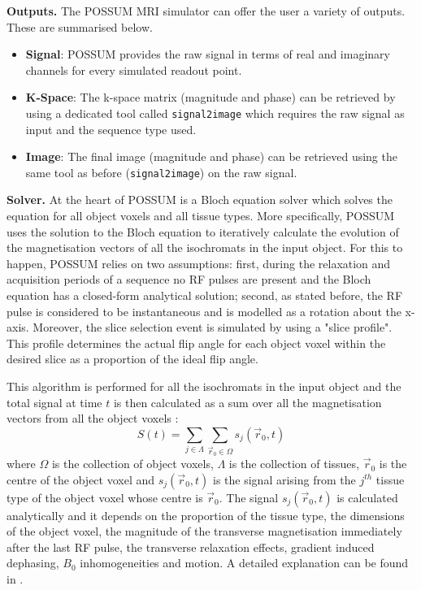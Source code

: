 \hfill

\textbf{Outputs.} The POSSUM MRI simulator can offer the user a variety of outputs.
These are summarised below.
\begin{itemize}
    
    \item \textbf{Signal}: POSSUM provides the raw signal in terms of real and imaginary channels for every simulated readout point.
    
    \item \textbf{K-Space}: The k-space matrix (magnitude and phase) can be retrieved by using a dedicated tool called \texttt{signal2image} which requires the raw signal as input and the sequence type used.
    
    \item \textbf{Image}: The final image (magnitude and phase) can be retrieved using the same tool as before (\texttt{signal2image}) on the raw signal.
    
\end{itemize}

\hfill

\textbf{Solver.} At the heart of POSSUM is a Bloch equation solver which solves the equation for all object voxels and all tissue types.
More specifically, POSSUM uses the solution to the Bloch equation to iteratively calculate the evolution of the magnetisation vectors of all the isochromats in the input object.
For this to happen, POSSUM relies on two assumptions: 
first, during the relaxation and acquisition periods of a sequence no RF pulses are present and the Bloch equation has a closed-form analytical solution;
second, as stated before, the RF pulse is considered to be instantaneous and is modelled as a rotation about the x-axis.
Moreover, the slice selection event is simulated by using a "slice profile".
This profile determines the actual flip angle for each object voxel within the desired slice as a proportion of the ideal flip angle.

\hfill

This algorithm is performed for all the isochromats in the input object and the total signal at time $t$ is then calculated as a sum over all the magnetisation vectors from all the object voxels \cite{Drobnjak2006}:
\begin{equation}
    S(t) = \sum_{j \in \Lambda} \sum_{\vec{r}_0 \in \Omega} s_j (\vec{r}_0, t)
\end{equation}
where $\Omega$ is the collection of object voxels, $\Lambda$ is the collection of tissues, $\vec{r}_0$ is the centre of the object voxel and $s_j(\vec{r}_0, t)$ is the signal arising from the $j^{th}$ tissue type of the object voxel whose centre is $\vec{r}_0$.
The signal $s_j(\vec{r}_0, t)$ 
is calculated analytically and it 
depends on the proportion of the tissue type, the dimensions of the object voxel, the magnitude of the transverse magnetisation immediately after the last RF pulse, the transverse relaxation effects, gradient induced dephasing, $B_0$ inhomogeneities and motion.
A detailed explanation can be found in \cite{Drobnjak2006}.

